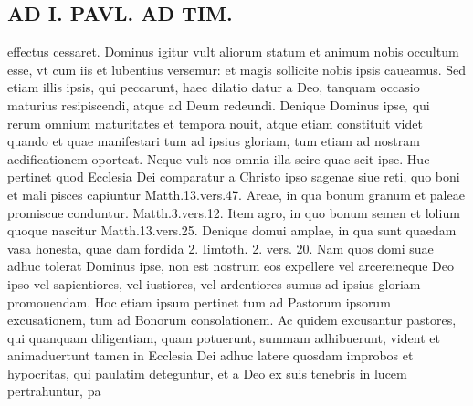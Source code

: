 \documentclass{article}
\begin{document}
\begin{pages}
\section*{AD I. PAVL. AD TIM. }
\marginpar{[ p.380 ]}\pstart effectus cessaret. Dominus igitur vult aliorum statum et animum nobis occultum esse, vt cum iis et lubentius versemur: et magis sollicite nobis ipsis caueamus. Sed etiam illis ipsis, qui peccarunt, haec dilatio datur a Deo, tanquam occasio maturius resipiscendi, atque ad Deum redeundi.  \pend\pstart Denique Dominus ipse, qui rerum omnium maturitates et tempora nouit, atque etiam constituit videt quando et quae manifestari tum ad ipsius gloriam, tum etiam ad nostram aedificationem oporteat. Neque vult nos omnia illa scire quae scit ipse.  \pend\pstart Huc pertinet quod Ecclesia Dei comparatur a Christo ipso sagenae siue reti, quo boni et mali pisces capiuntur Matth.13.vers.47. Areae, in qua bonum granum et paleae promiscue conduntur. Matth.3.vers.12. Item agro, in quo bonum semen et lolium quoque nascitur Matth.13.vers.25. Denique domui amplae, in qua sunt quaedam vasa honesta, quae dam fordida 2. Iimtoth. 2. vers. 20. Nam quos domi suae adhuc tolerat Dominus ipse, non est nostrum eos expellere vel arcere:neque Deo ipso vel sapientiores, vel iustiores, vel ardentiores sumus ad ipsius gloriam promouendam.  \pend\pstart Hoc etiam ipsum pertinet tum ad Pastorum ipsorum excusationem, tum ad Bonorum consolationem. Ac quidem excusantur pastores, qui quanquam diligentiam, quam potuerunt, summam adhibuerunt, vident et animaduertunt tamen in Ecclesia Dei adhuc latere quosdam improbos et hypocritas, qui paulatim deteguntur, et a Deo ex suis tenebris in lucem pertrahuntur, pa\pend

\end{pages}
\end{document}
